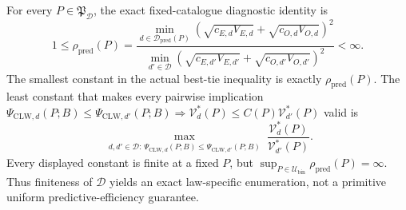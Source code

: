 For every \(P\in\mathfrak P_{\mathcal D}\), the exact fixed-catalogue diagnostic identity is
\[
1\le\rho_{\mathrm{pred}}(P)
=\frac{\min_{d\in\mathcal D_{\mathrm{pred}}(P)}
(\sqrt{c_{E,d}V_{E,d}}+\sqrt{c_{O,d}V_{O,d}})^2}
{\min_{d'\in\mathcal D}
(\sqrt{c_{E,d'}V_{E,d'}}+\sqrt{c_{O,d'}V_{O,d'}})^2}<\infty.
\]
The smallest constant in the actual best-tie inequality is exactly \(\rho_{\mathrm{pred}}(P)\). The least constant that makes every pairwise implication \(\Psi_{\mathrm{CLW},d}(P;B)\le\Psi_{\mathrm{CLW},d'}(P;B)\Rightarrow \mathcal V_d^*(P)\le C(P)\mathcal V_{d'}^*(P)\) valid is
\[
\max_{\substack{d,d'\in\mathcal D:\,
\Psi_{\mathrm{CLW},d}(P;B)\le\Psi_{\mathrm{CLW},d'}(P;B)}}
\frac{\mathcal V_d^*(P)}{\mathcal V_{d'}^*(P)}.
\]
Every displayed constant is finite at a fixed \(P\), but \(\sup_{P\in\mathcal U_{\mathrm{bin}}}\rho_{\mathrm{pred}}(P)=\infty\). Thus finiteness of \(\mathcal D\) yields an exact law-specific enumeration, not a primitive uniform predictive-efficiency guarantee.